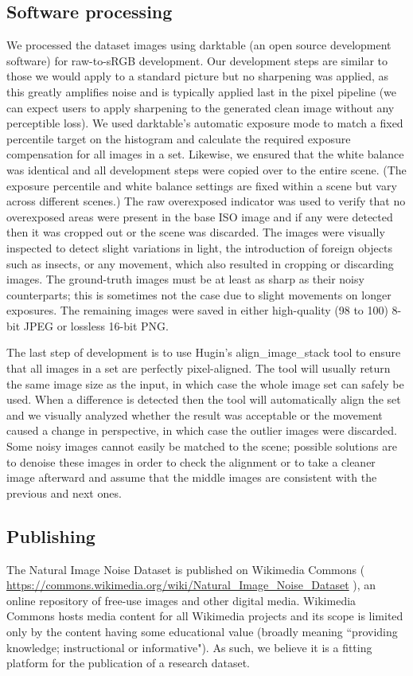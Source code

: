 \documentclass[10pt,twocolumn,letterpaper]{article}
\begin{document}
\subsection{Software processing}
We processed the dataset images using darktable \cite{darktable} (an open source development software) for raw-to-sRGB development. Our development steps are similar to those we would apply to a standard picture but no sharpening was applied, as this greatly amplifies noise and is typically applied last in the pixel pipeline (we can expect users to apply sharpening to the generated clean image without any perceptible loss). We used darktable's automatic exposure mode to match a fixed percentile target on the histogram and calculate the required exposure compensation for all images in a set. Likewise, we ensured that the white balance was identical and all development steps were copied over to the entire scene. (The exposure percentile and white balance settings are fixed within a scene but vary across different scenes.) The raw overexposed indicator was used to verify that no overexposed areas were present in the base ISO image and if any were detected then it was cropped out or the scene was discarded. The images were visually inspected to detect slight variations in light, the introduction of foreign objects such as insects, or any movement, which also resulted in cropping or discarding images. The ground-truth images must be at least as sharp as their noisy counterparts; this is sometimes not the case due to slight movements on longer exposures. The remaining images were saved in either high-quality (98 to 100) 8-bit JPEG or lossless 16-bit PNG.

The last step of development is to use Hugin's align\_image\_stack tool \cite{hugin} to ensure that all images in a set are perfectly pixel-aligned. The tool will usually return the same image size as the input, in which case the whole image set can safely be used. When a difference is detected then the tool will automatically align the set and we visually analyzed whether the result was acceptable or the movement caused a change in perspective, in which case the outlier images were discarded. Some noisy images cannot easily be matched to the scene; possible solutions are to denoise these images in order to check the alignment or to take a cleaner image afterward and assume that the middle images are consistent with the previous and next ones.
\subsection{Publishing}
The Natural Image Noise Dataset is published on Wikimedia Commons ( \url{https://commons.wikimedia.org/wiki/Natural_Image_Noise_Dataset} ), an online repository of free-use images and other digital media. Wikimedia Commons hosts media content for all Wikimedia projects and its scope is limited only by the content having some educational value (broadly meaning ``providing knowledge; instructional or informative"). As such, we believe it is a fitting platform for the publication of a research dataset.
\end{document}
